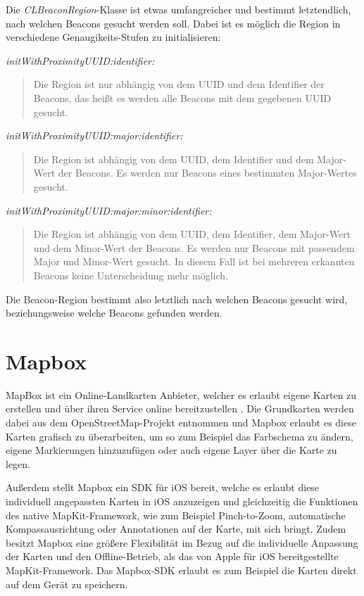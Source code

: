 Die \emph{CLBeaconRegion}-Klasse ist etwas umfangreicher und bestimmt letztendlich, nach welchen Beacons gesucht werden soll.
Dabei ist es möglich die Region in verschiedene Genaugikeits-Stufen zu initialisieren:


\emph{initWithProximityUUID:identifier:}\begin{quote}
	Die Region ist nur abhängig von dem UUID und dem Identifier der Beacons, das heißt es werden alle Beacons mit dem gegebenen UUID gesucht.
\end{quote}
\emph{initWithProximityUUID:major:identifier:}\begin{quote}
	Die Region ist abhängig von dem UUID, dem Identifier und dem Major-Wert der Beacons. Es werden nur Beacons eines bestimmten Major-Wertes gesucht.
\end{quote}
\emph{initWithProximityUUID:major:minor:identifier:}\begin{quote}
	Die Region ist abhängig von dem UUID, dem Identifier, dem Major-Wert und dem Minor-Wert der Beacons. Es werden nur Beacons mit passendem Major und Minor-Wert gesucht. In diesem Fall ist bei mehreren erkannten Beacons keine Unterscheidung mehr möglich.
\end{quote}

Die Beacon-Region bestimmt also letztlich nach welchen Beacons gesucht wird, beziehungsweise welche Beacons gefunden werden.

\section{Mapbox}
\label{sec:sec:technologies:mapbox}
MapBox ist ein Online-Landkarten Anbieter, welcher es erlaubt eigene Karten zu erstellen und über ihren Service online bereitzustellen \cite{mapboxweb}. 
Die Grundkarten werden dabei aus dem OpenStreetMap-Projekt entnommen und Mapbox erlaubt es diese Karten grafisch zu überarbeiten, um so zum Beispiel das Farbschema zu ändern, eigene Markierungen hinzuzufügen oder auch eigene Layer über die Karte zu legen.

Außerdem stellt Mapbox ein SDK \cite{mapboxsdk} für iOS bereit, welche es erlaubt diese individuell angepassten Karten in iOS anzuzeigen und gleichzeitig die Funktionen des native MapKit-Framework, wie zum Beispiel Pinch-to-Zoom, automatische Kompassausrichtung oder Annotationen auf der Karte, mit sich bringt. Zudem besitzt Mapbox eine größere Flexibilität im Bezug auf die individuelle Anpassung der Karten und den Offline-Betrieb, als das von Apple für iOS bereitgestellte MapKit-Framework. Das Mapbox-SDK erlaubt es zum Beispiel die Karten direkt auf dem Gerät zu speichern.

